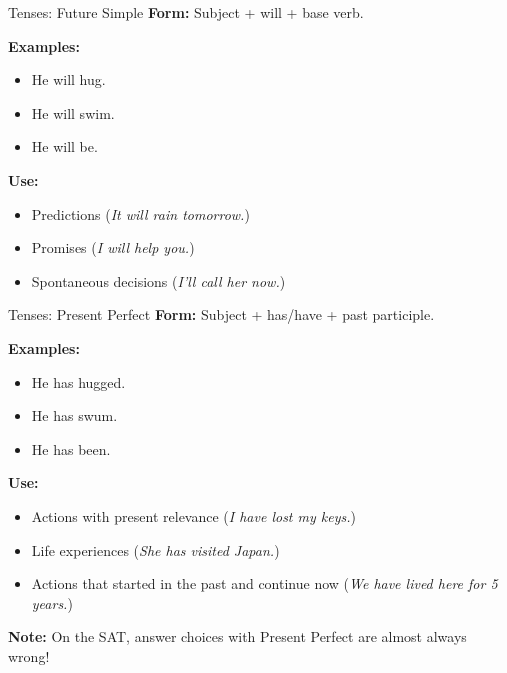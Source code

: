 \documentclass[aspectratio=169,11pt]{beamer}
\begin{document}
\begin{frame}{Tenses: Future Simple}
\small
\textbf{Form:} Subject + will + base verb.  

\textbf{Examples:}
\begin{itemize}
  \item He will hug.
  \item He will swim.
  \item He will be.
\end{itemize}

\textbf{Use:}
\begin{itemize}
  \item Predictions (\emph{It will rain tomorrow.})
  \item Promises (\emph{I will help you.})
  \item Spontaneous decisions (\emph{I’ll call her now.})
\end{itemize}
\end{frame}

\begin{frame}{Tenses: Present Perfect}
\small
\textbf{Form:} Subject + has/have + past participle.  

\textbf{Examples:}
\begin{itemize}
  \item He has hugged.
  \item He has swum.
  \item He has been.
\end{itemize}

\textbf{Use:}
\begin{itemize}
  \item Actions with present relevance (\emph{I have lost my keys.})
  \item Life experiences (\emph{She has visited Japan.})
  \item Actions that started in the past and continue now (\emph{We have lived here for 5 years.})
\end{itemize}

\textbf{Note:} On the SAT, answer choices with Present Perfect are almost always wrong!
\end{frame}
\end{document}
